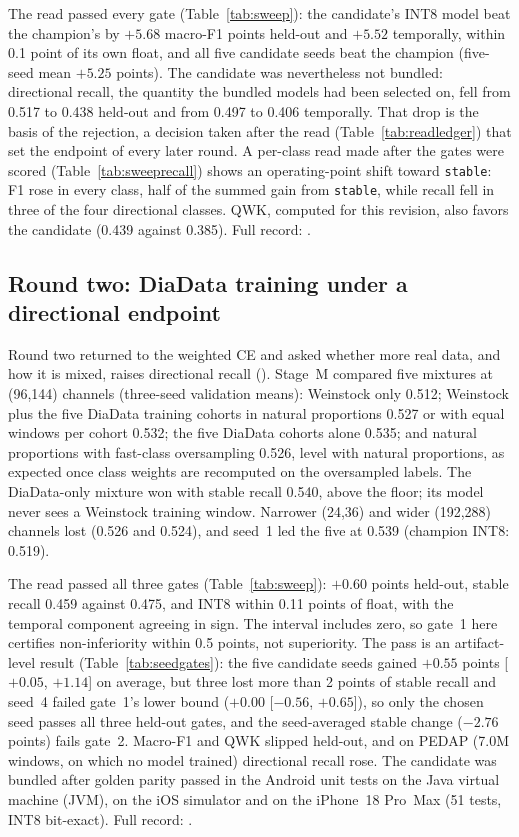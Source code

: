 \documentclass[10pt,twocolumn]{article}
\begin{document}
The read passed every gate (Table~\ref{tab:sweep}): the candidate's INT8
model beat the champion's by $+5.68$ macro-F1 points held-out and
$+5.52$ temporally, within 0.1 point of its own float, and all five
candidate seeds beat the champion (five-seed mean $+5.25$ points). The
candidate was nevertheless not bundled: directional recall, the quantity
the bundled models had been selected on, fell from 0.517 to 0.438
held-out and from 0.497 to 0.406 temporally. That drop is the basis of
the rejection, a decision taken after the read (Table~\ref{tab:readledger})
that set the endpoint of every later round. A per-class read made after
the gates were scored (Table~\ref{tab:sweeprecall}) shows an
operating-point shift toward \texttt{stable}: F1 rose in every class, half
of the summed gain from \texttt{stable}, while recall fell in three of the
four directional classes. QWK, computed for this revision, also favors
the candidate (0.439 against 0.385). Full record:
.

\subsection{Round two: DiaData training under a directional endpoint}

Round two returned to the weighted CE and asked whether more real data,
and how it is mixed, raises directional recall
(). Stage~M compared five mixtures at
(96,144) channels (three-seed validation means): Weinstock only 0.512;
Weinstock plus the five DiaData training cohorts in natural proportions
0.527 or with equal windows per cohort 0.532; the five DiaData cohorts
alone 0.535; and natural proportions with fast-class oversampling 0.526,
level with natural proportions, as expected once class weights are
recomputed on the oversampled labels. The DiaData-only mixture won with
stable recall 0.540, above the floor; its model never sees a Weinstock
training window. Narrower (24,36) and wider (192,288) channels lost (0.526
and 0.524), and seed~1 led the five at 0.539 (champion INT8: 0.519).

The read passed all three gates (Table~\ref{tab:sweep}): $+0.60$ points
held-out, stable recall 0.459 against 0.475, and INT8 within 0.11 points
of float, with the temporal component agreeing in sign. The interval
includes zero, so gate~1 here certifies non-inferiority within 0.5 points,
not superiority. The pass is an artifact-level result
(Table~\ref{tab:seedgates}): the five candidate seeds gained $+0.55$
points [$+0.05$, $+1.14$] on average, but three lost more than 2 points
of stable recall and seed~4 failed gate~1's lower bound ($+0.00$
[$-0.56$, $+0.65$]), so only the chosen seed passes all three held-out
gates, and the seed-averaged stable change
($-2.76$ points) fails gate~2. Macro-F1 and QWK slipped held-out, and on
PEDAP (7.0M windows, on which no model trained) directional recall rose.
The candidate was bundled after golden parity passed in the Android unit
tests on the Java virtual machine (JVM), on the iOS simulator and on the
iPhone~18 Pro~Max (51 tests, INT8 bit-exact). Full record:
.
\end{document}
